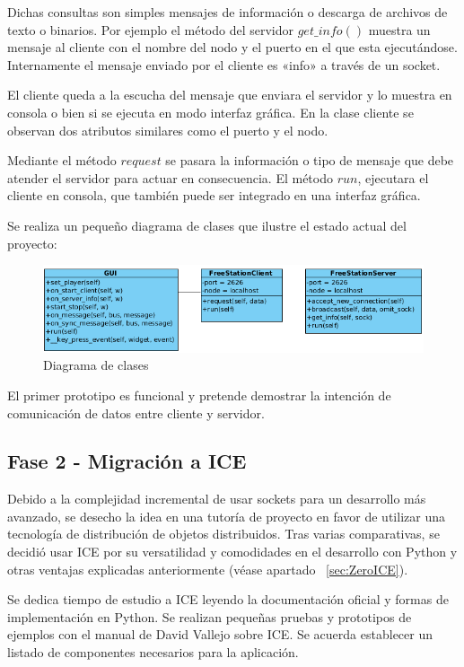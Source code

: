 Dichas consultas son simples mensajes de información o descarga de archivos
de texto o binarios. Por ejemplo el método del servidor $get\_info()$ muestra un
mensaje al cliente con el nombre del nodo y el puerto en el que esta 
ejecutándose. Internamente el mensaje enviado por el cliente es «info» a través
de un socket.

El cliente queda a la escucha del mensaje que enviara el servidor y lo muestra
en consola o bien si se ejecuta en modo interfaz gráfica. En la clase cliente se
observan dos atributos similares como el puerto y el nodo.

Mediante el método $request$ se pasara la información o tipo de mensaje que debe
atender el servidor para actuar en consecuencia. El método $run$, ejecutara el
cliente en consola, que también puede ser integrado en una interfaz gráfica.

Se realiza un pequeño diagrama de clases que ilustre el estado actual del
proyecto:

\begin{figure}[ht]
    \begin{center}
        \includegraphics[width=460px]{src/img/class-diagram.png}
        \caption[Diagrama de clases]
          {Diagrama de clases}
    \end{center}
\end{figure}

El primer prototipo es funcional y pretende demostrar la intención de
comunicación de datos entre cliente y servidor.

\subsection{Fase 2 - Migración a ICE}

Debido a la complejidad incremental de usar sockets para un desarrollo más
avanzado, se desecho la idea en una tutoría de proyecto en favor de utilizar una
tecnología de distribución de objetos distribuidos. Tras varias comparativas, se
decidió usar \acs{ICE} por su versatilidad y comodidades en el desarrollo con
Python y otras ventajas explicadas anteriormente (véase
apartado ~\ref{sec:ZeroICE}).

Se dedica tiempo de estudio a ICE leyendo la documentación oficial\cite{Spr12} y
formas de implementación en Python.
Se realizan pequeñas pruebas y prototipos de ejemplos con el manual de David
Vallejo sobre ICE\cite{Val06}. Se acuerda establecer un listado de componentes
necesarios para la aplicación.

